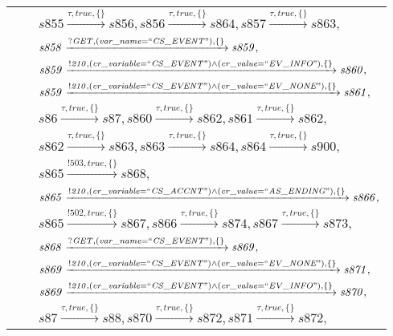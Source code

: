 \begin{tabular}{lcp{350px}}
& & $\mathit{s855}\xrightarrow{\mathit{\tau}, \mathit{true}, \{\}}\mathit{s856},\mathit{s856}\xrightarrow{\mathit{\tau}, \mathit{true}, \{\}}\mathit{s864},\mathit{s857}\xrightarrow{\mathit{\tau}, \mathit{true}, \{\}}\mathit{s863},$ \\
& & $\mathit{s858}\xrightarrow{\mathit{?GET}, \mathit{(var\_name = ``CS\_EVENT")}, \{\}}\mathit{s859},$ \\
& & $\mathit{s859}\xrightarrow{\mathit{!210}, \mathit{(cr\_variable = ``CS\_EVENT") \land (cr\_value = ``EV\_INFO")}, \{\}}\mathit{s860},$ \\
& & $\mathit{s859}\xrightarrow{\mathit{!210}, \mathit{(cr\_variable = ``CS\_EVENT") \land (cr\_value = ``EV\_NONE")}, \{\}}\mathit{s861},$ \\
& & $\mathit{s86}\xrightarrow{\mathit{\tau}, \mathit{true}, \{\}}\mathit{s87},\mathit{s860}\xrightarrow{\mathit{\tau}, \mathit{true}, \{\}}\mathit{s862},\mathit{s861}\xrightarrow{\mathit{\tau}, \mathit{true}, \{\}}\mathit{s862},$ \\
& & $\mathit{s862}\xrightarrow{\mathit{\tau}, \mathit{true}, \{\}}\mathit{s863},\mathit{s863}\xrightarrow{\mathit{\tau}, \mathit{true}, \{\}}\mathit{s864},\mathit{s864}\xrightarrow{\mathit{\tau}, \mathit{true}, \{\}}\mathit{s900},$ \\
& & $\mathit{s865}\xrightarrow{\mathit{!503}, \mathit{true}, \{\}}\mathit{s868},$ \\
& & $\mathit{s865}\xrightarrow{\mathit{!210}, \mathit{(cr\_variable = ``CS\_ACCNT") \land (cr\_value = ``AS\_ENDING")}, \{\}}\mathit{s866},$ \\
& & $\mathit{s865}\xrightarrow{\mathit{!502}, \mathit{true}, \{\}}\mathit{s867},\mathit{s866}\xrightarrow{\mathit{\tau}, \mathit{true}, \{\}}\mathit{s874},\mathit{s867}\xrightarrow{\mathit{\tau}, \mathit{true}, \{\}}\mathit{s873},$ \\
& & $\mathit{s868}\xrightarrow{\mathit{?GET}, \mathit{(var\_name = ``CS\_EVENT")}, \{\}}\mathit{s869},$ \\
& & $\mathit{s869}\xrightarrow{\mathit{!210}, \mathit{(cr\_variable = ``CS\_EVENT") \land (cr\_value = ``EV\_NONE")}, \{\}}\mathit{s871},$ \\
& & $\mathit{s869}\xrightarrow{\mathit{!210}, \mathit{(cr\_variable = ``CS\_EVENT") \land (cr\_value = ``EV\_INFO")}, \{\}}\mathit{s870},$ \\
& & $\mathit{s87}\xrightarrow{\mathit{\tau}, \mathit{true}, \{\}}\mathit{s88},\mathit{s870}\xrightarrow{\mathit{\tau}, \mathit{true}, \{\}}\mathit{s872},\mathit{s871}\xrightarrow{\mathit{\tau}, \mathit{true}, \{\}}\mathit{s872},$ \\

\end{tabular}
